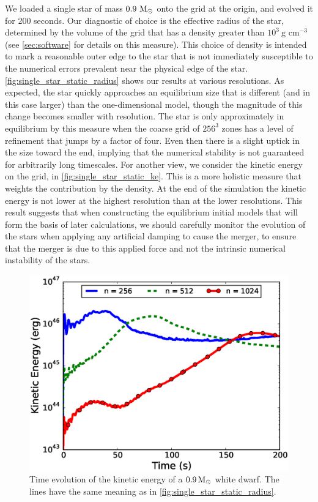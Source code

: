 \documentclass[12pt]{article}
\begin{document}
We loaded a single star of mass $0.9\ \msolar$ onto the grid at the
origin, and evolved it for 200 seconds. Our diagnostic of choice is
the effective radius of the star, determined by the volume of the grid
that has a density greater than $10^3\ \text{g cm}^{-3}$ (see
\autoref{sec:software} for details on this measure). This choice
of density is intended to mark a reasonable outer edge to the star
that is not immediately susceptible to the numerical errors prevalent
near the physical edge of the star.
\autoref{fig:single_star_static_radius} shows our results at various
resolutions.  As expected, the star quickly approaches an equilibrium
size that is different (and in this case larger) than the
one-dimensional model, though the magnitude of this change becomes
smaller with resolution. The star is only approximately in equilibrium 
by this measure when the coarse grid of $256^3$ zones has a level of 
refinement that jumps by a factor of four. Even then there is a slight uptick
in the size toward the end, implying that the numerical stability is
not guaranteed for arbitrarily long timescales. For another view, we 
consider the kinetic energy on the grid, in \autoref{fig:single_star_static_ke}. 
This is a more holistic measure that weights the contribution by the density. 
At the end of the simulation the kinetic energy is not lower at the highest 
resolution than at the lower resolutions. This result suggests
that when constructing the equilibrium initial models that will form the
basis of later calculations, we should carefully monitor the evolution
of the stars when applying any artificial damping to cause the
merger, to ensure that the merger is due to this applied force and not
the intrinsic numerical instability of the stars.
\begin{figure}[h!]
  \centering
  \includegraphics[scale=0.80,trim=0.1in 0.0in 0.55in 0.45in,clip]{plots/single_star_static_ke}
  \caption[Kinetic energy evolution of static white dwarf]
          {Time evolution of the kinetic energy of a $0.9\, \mathrm{M}_\odot$ 
           white dwarf. The lines have the same meaning as in \autoref{fig:single_star_static_radius}.
           \label{fig:single_star_static_ke}}
\end{figure}
\end{document}
